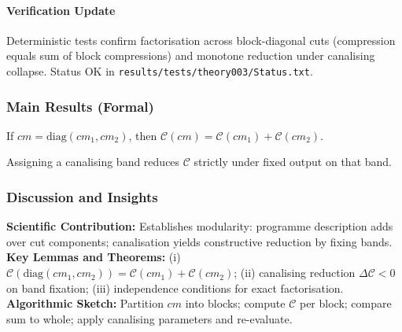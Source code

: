 \documentclass{article}
\begin{document}
\paragraph{Verification Update} Deterministic tests confirm factorisation across block-diagonal cuts (compression equals sum of block compressions) and monotone reduction under canalising collapse. Status OK in \texttt{results/tests/theory003/Status.txt}.
\subsubsection*{Main Results (Formal)}
\begin{theorem}
If \(cm=\mathrm{diag}(cm_1,cm_2)\), then \(\mathcal{C}(cm)=\mathcal{C}(cm_1)+\mathcal{C}(cm_2)\).
\end{theorem}
\begin{lemma}
Assigning a canalising band reduces \(\mathcal{C}\) strictly under fixed output on that band.
\end{lemma}
\subsubsection*{Discussion and Insights}
\textbf{Scientific Contribution:} Establishes modularity: programme description adds over cut components; canalisation yields constructive reduction by fixing bands.\\
\textbf{Key Lemmas and Theorems:} (i) \(\mathcal{C}(\mathrm{diag}(cm_1,cm_2))=\mathcal{C}(cm_1)+\mathcal{C}(cm_2)\); (ii) canalising reduction \(\Delta \mathcal{C}<0\) on band fixation; (iii) independence conditions for exact factorisation.\\
\textbf{Algorithmic Sketch:} Partition \(cm\) into blocks; compute \(\mathcal{C}\) per block; compare sum to whole; apply canalising parameters and re-evaluate.
\end{document}
